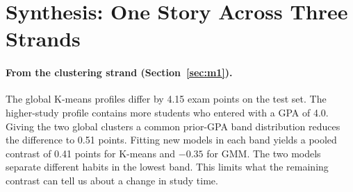 \section{Synthesis: One Story Across Three Strands}
\label{sec:synthesis}

\paragraph{From the clustering strand (Section~\ref{sec:m1}).}
The global K-means profiles differ by 4.15 exam points on the test set.
The higher-study profile contains more students who entered with a GPA of
4.0. Giving the two global clusters a common prior-GPA band distribution
reduces the difference to 0.51 points. Fitting new models in each band
yields a pooled contrast of 0.41 points for K-means and $-0.35$ for GMM.
The two models separate different habits in the lowest band. This limits
what the remaining contrast can tell us about a change in study time.


